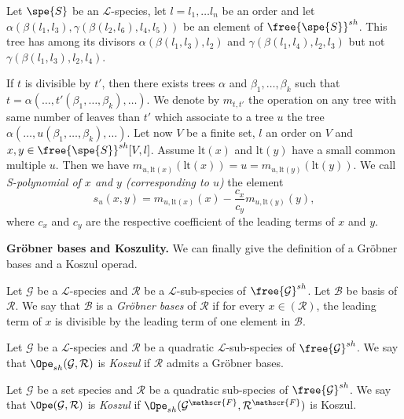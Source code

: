 \begin{exam}
    Let $\spe{S}$ be an $\mathscr{L}$-species, let $l=l_1,\dots l_n$ be an order and let $\alpha(\beta(l_1,l_3),\gamma(\beta(l_2,l_6),l_4,l_5))$ be an element of $\free{\spe{S}}^{sh}$.
    This tree has among its divisors $\alpha(\beta(l_1,l_3),l_2)$ and $\gamma(\beta(l_1,l_4),l_2,l_3)$ but not $\gamma(\beta(l_1,l_3),l_2,l_4)$.
\end{exam}

If $t$ is divisible by $t'$, then there exists trees $\alpha$ and $\beta_1,\dots,\beta_k$ such that $t=\alpha(\dots, t'(\beta_1,\dots,\beta_k), \dots)$. We denote
by $m_{t,t'}$ the operation on any tree with same number of leaves than $t'$ which associate to a tree $u$ the tree $\alpha(\dots, u(\beta_1,\dots,\beta_k),\dots)$.
Let now $V$ be a finite set, $l$ an order on $V$ and $x,y\in\free{\spe{S}}^{sh}[V,l]$. Assume $\text{lt}(x)$ and $\text{lt}(y)$ have a small 
common multiple $u$. Then we have $m_{u,\text{lt}(x)}(\text{lt}(x)) = u = m_{u,\text{lt}(y)}(\text{lt}(y))$. We call {\em S-polynomial of $x$ and $y$ 
(corresponding to $u$)} the element
\begin{equation}
    s_u(x,y)= m_{u,\text{lt}(x)}(x) -\frac{c_x}{c_y}m_{u,\text{lt}(y)}(y),
\end{equation}
where $c_x$ and $c_y$ are the respective coefficient of the leading terms of $x$ and $y$.

\noindent\textbf{Gröbner bases and Koszulity.} We can finally give the definition of a Gröbner bases and a Koszul operad.

\begin{defi}[{\cite[Definition 13]{DK10}}]
    Let $\mathcal{G}$ be a $\mathscr{L}$-species and $\mathcal{R}$ be a $\mathscr{L}$-sub-species of $\free{\mathcal{G}}^{sh}$. Let $\mathcal{B}$ 
    be basis of $\mathcal{R}$.
    We say that $\mathcal{B}$ is a {\em Gröbner bases} of $\mathcal{R}$ if for every $x\in(\mathcal{R})$, the leading term of $x$ is divisible by 
    the leading term of one element in $\mathcal{B}$.
\end{defi}

\begin{defi}[{\cite[Corollary 3]{DK10}}]
    Let $\mathcal{G}$ be a $\mathscr{L}$-species and $\mathcal{R}$ be a quadratic $\mathscr{L}$-sub-species of $\free{\mathcal{G}}^{sh}$. We say that
    $\Ope_{sh}(\mathcal{G},\mathcal{R})$ is {\em Koszul} if $\mathcal{R}$ admits a Gröbner bases.

    Let $\mathcal{G}$ be a set species and $\mathcal{R}$ be a quadratic sub-species of $\free{\mathcal{G}}^{sh}$. We say that
    $\Ope(\mathcal{G},\mathcal{R})$ is {\em Koszul} if $\Ope_{sh}(\mathcal{G}^{\mathscr{F}},\mathcal{R}^{\mathscr{F}})$ is Koszul.
\end{defi}

